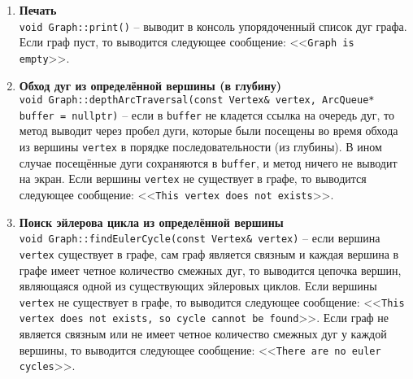 \begin{enumerate}
    \item \textbf{Печать} \\
    \texttt{void Graph::print()} -- выводит в консоль упорядоченный список дуг графа. Если граф пуст, то выводится следующее сообщение: <<\texttt{Graph is empty}>>.

    \item \textbf{Обход дуг из определённой вершины (в глубину)} \\
    \texttt{void Graph::depthArcTraversal(const Vertex\& vertex, ArcQueue* buffer = nullptr)} -- если в \texttt{buffer} не кладется ссылка на очередь дуг, то метод выводит через пробел дуги, которые были посещены во время обхода из вершины \texttt{vertex} в порядке последовательности (из глубины). В ином случае посещённые дуги сохраняются в \texttt{buffer}, и метод ничего не выводит на экран. Если вершины \texttt{vertex} не существует в графе, то выводится следующее сообщение: <<\texttt{This vertex does not exists}>>.

    \item \textbf{Поиск эйлерова цикла из определённой вершины} \\
    \texttt{void Graph::findEulerCycle(const Vertex\& vertex)} -- если вершина \texttt{vertex} существует в графе, сам граф является связным и каждая вершина в графе имеет четное количество смежных дуг, то выводится цепочка вершин, являющаяся одной из существующих эйлеровых циклов. Если вершины \texttt{vertex} не существует в графе, то выводится следующее сообщение: <<\texttt{This vertex does not exists, so cycle cannot be found}>>. Если граф не является связным или не имеет четное количество смежных дуг у каждой вершины, то выводится следующее сообщение: <<\texttt{There are no euler cycles}>>.
\end{enumerate}

\newpage